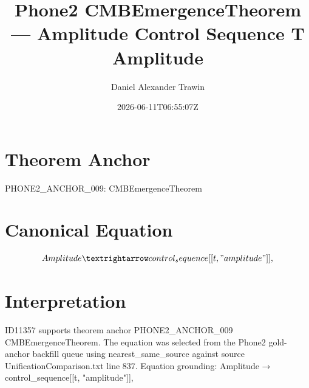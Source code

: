 \documentclass[11pt]{article}
\title{Phone2 CMBEmergenceTheorem — Amplitude Control Sequence T Amplitude}
\author{Daniel Alexander Trawin}
\date{2026-06-11T06:55:07Z}
\begin{document}
\maketitle
\section*{Theorem Anchor}
PHONE2_ANCHOR_009: CMBEmergenceTheorem
\section*{Canonical Equation}
\[
Amplitude → control_sequence[[t, "amplitude"]],
\]
\section*{Interpretation}
ID11357 supports theorem anchor PHONE2_ANCHOR_009 CMBEmergenceTheorem. The equation was selected from the Phone2 gold-anchor backfill queue using nearest_same_source against source UnificationComparison.txt line 837. Equation grounding: Amplitude → control_sequence[[t, "amplitude"]],
\end{document}
